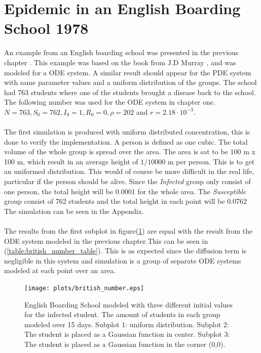 \documentclass[%
twoside,                 %
final,                   %
10pt]{article}
\begin{document}
\section{Epidemic in an English Boarding School 1978}
An example from an English boarding school was presented in the previous chapter . This example was based on the book from J.D Murray \cite{murray2002mathematical}, and was modeled for a ODE system. A similar result should appear for the PDE system with same parameter values and a uniform distribution of the groups. The school had 763 students where one of the students brought a disease back to the school. The following number was used for the ODE system in chapter one. $N=763, S_0=762,I_0=1,R_0=0,\rho=202$ and $r = 2.18\cdot 10^{-3}$. 
\\
\\
The first simulation is produced with uniform distributed concentration, this is done to verify the implementation. A person is defined as one cubic. The total volume of the whole group is spread over the area. The area is sat to be 100 m x 100 m, which result in an average height of $1/10000$ m per person. This is to get an uniformed distribution. This would of course be more difficult in the real life, particular if the person should be alive. Since the \emph{Infected} group only consist of one person, the total height will be 0.0001 for the whole area. The \emph{Susceptible} group consist of 762 students and the total height in each point will be 0.0762 The simulation can be seen in the Appendix. 
\\
\\
The results from the first subplot in figure(\ref{fig:british_number}) are equal with the result from the ODE system modeled in the previous chapter.This can be seen in (\ref{table:british_number_table}). This is as expected since the diffusion term is negligible in this system and simulation is a group of separate ODE systems modeled at each point over an area.


\begin{figure}[ht]
  \centerline{\texttt{[image: plots/british\_number.eps]}}
  \caption{
  \label{fig:british_number} English Boarding School modeled with three different initial values for the infected student. The amount of students in each group modeled over 15 days. Subplot 1: uniform distribution. Subplot 2: The student is placed as a Gaussian function in center. Subplot 3: The student is placed as a Gaussian function in the corner (0,0).
  }
\end{figure}
\end{document}
